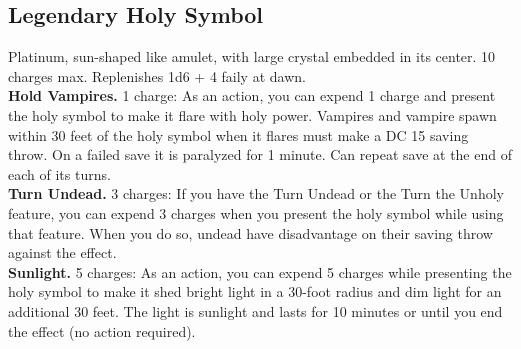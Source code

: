 \documentclass{article}
\begin{document}
\subsection{Legendary Holy Symbol}
Platinum, sun-shaped like amulet, with large crystal embedded in its center.
10 charges max. Replenishes 1d6 + 4 faily at dawn.\\
\textbf{Hold Vampires.} 1 charge: As an action, you can expend 1 charge and present the holy symbol to make it flare with holy power. Vampires and vampire spawn within 30 feet of the holy symbol when it flares must make a DC 15 saving throw. On a failed save it is paralyzed for 1 minute. Can repeat save at the end of each of its turns. \\
\textbf{Turn Undead.} 3 charges: If you have the Turn Undead or the Turn the Unholy feature, you can expend 3 charges when you present the holy symbol while using that feature. When you do so, undead have disadvantage on their saving throw against the effect.\\
\textbf{Sunlight.} 5 charges: As an action, you can expend 5 charges while presenting the holy symbol to make it shed bright light in a 30-foot radius and dim light for an additional 30 feet. The light is sunlight and lasts for 10 minutes or until you end the effect (no action required).
\end{document}

